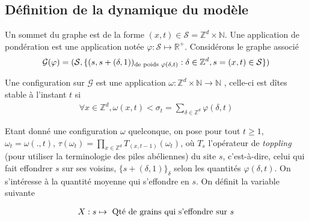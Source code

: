 \documentclass{article}
\theoremstyle{definition}
\begin{document}
\subsection{Définition de la dynamique du modèle}
Un sommet du graphe est de la forme $(x,t)\in \mathcal{S} = \mathbb{Z}^d\times \mathbb{N}$. Une application de pondération est une application notée $\varphi : \mathcal{S}\mapsto \mathbb{R}^+$. Considérons le graphe associé 
\begin{align*}
	\mathcal{G}(\varphi) = (\mathcal{S}, \{(s,s+(\delta,1))_{\textup{de poids } \varphi(\delta,t)} : \delta\in \mathbb{Z}^d, s=(x,t)\in \mathcal{S}\})
\end{align*}

Une configuration sur $\mathcal{G}$ est une application $\omega : \mathbb{Z}^d\times\mathbb{N}\to \mathbb{N}$ , celle-ci est dîtes stable à l'instant $t$ si
\begin{align*}
	\forall x\in\mathbb{Z}^d, \omega(x,t)<\sigma_t = \sum_{\delta\in \mathbb{Z}^d}\varphi(\delta,t)
\end{align*}

Etant donné une configuration $\omega$ quelconque, on pose pour tout $t\geq 1$, $\omega_t = \omega(.,t)$, $\tau(\omega_t) = \prod_{x\in \mathbb{Z}^d} T_{(x,t-1)} (\omega_t)$, où $T_s$ l'opérateur de \textit{toppling} (pour utiliser la terminologie des piles abéliennes) du site $s$, c'est-à-dire, celui qui fait effondrer $s$ sur ses voisins, $\{s+(\delta, 1)\}_{\delta}$ selon les quantités $\varphi(\delta,t)$. On s'intéresse à la quantité moyenne qui s'effondre en $s$. On définit la variable suivante

\begin{align*}
	X : s \mapsto \textup{ Qté de grains qui s'effondre sur } s\\
\end{align*}
\end{document}
